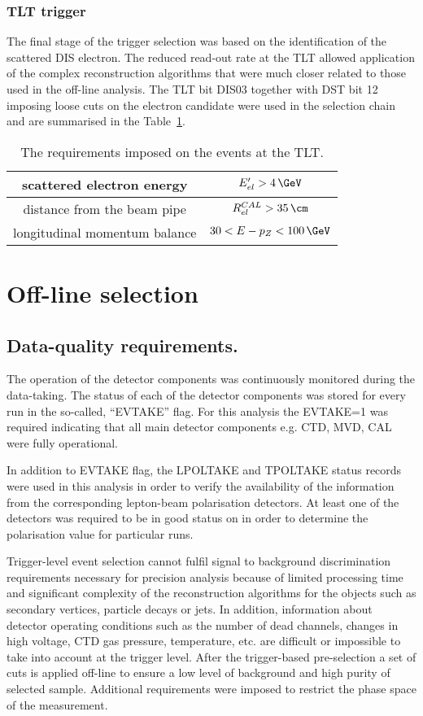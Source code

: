 \subsubsection{TLT trigger}
\label{subsec:tltcuts}
The final stage of the trigger selection was based on the identification of the scattered DIS electron. The reduced read-out rate at the TLT allowed application of the complex reconstruction algorithms that were much closer related to those used in the off-line analysis. The TLT bit \textsf{DIS03} together with DST bit 12 imposing loose cuts on the electron candidate were used in the selection chain and are summarised in the Table~\ref{tab:TLTDSTreq}.
\begin{table}[ht!]
\centering
\begin{tabular}{|c|c|}
\hline scattered electron energy & $E'_{el}>4\,\GeV$ \\ 
\hline distance from the beam pipe  & $R_{el}^{CAL}>35\,\cm$ \\ 
\hline longitudinal momentum balance & $30<E-p_Z<100\,\GeV$\\
\hline 
\end{tabular} 
\caption{The requirements imposed on the events at the TLT.}
\label{tab:TLTDSTreq}
\end{table}

\section{Off-line selection}
\label{sec:offlineselect}

\subsection{Data-quality requirements.}
The operation of the detector components was continuously monitored during the data-taking. The status of each of the detector components was stored for every run in the so-called, ``EVTAKE'' flag. For this analysis the EVTAKE=1 was required indicating that all main detector components e.g. CTD, MVD, CAL were fully operational.

In addition to EVTAKE flag, the LPOLTAKE and TPOLTAKE status records were used in this analysis in order to verify the availability of the information from the corresponding lepton-beam polarisation detectors. At least one of the detectors was required to be in good status on in order to determine the polarisation value for particular runs.

Trigger-level event selection cannot fulfil signal to background discrimination requirements necessary for precision analysis because of limited processing time and significant complexity of the reconstruction algorithms for the objects such as secondary vertices, particle decays or jets. In addition, information about detector operating conditions such as the number of dead channels, changes in high voltage, CTD gas pressure, temperature, etc. are difficult or impossible to take into account at the trigger level. After the trigger-based pre-selection a set of cuts is applied off-line to ensure a low level of background and high purity of selected sample. Additional requirements were imposed to restrict the phase space of the measurement. 

